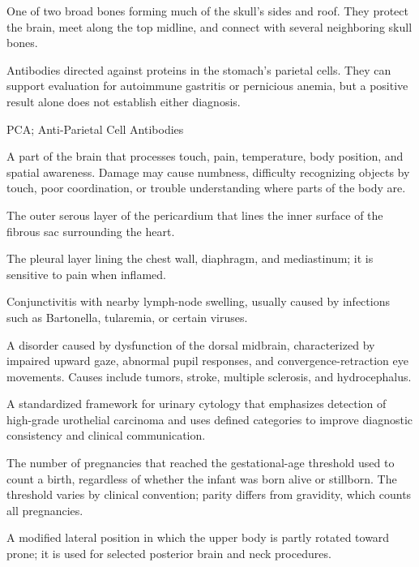  One of two broad bones forming much of the skull's sides and roof. They protect the brain, meet along the top midline, and connect with several neighboring skull bones.

 Antibodies directed against proteins in the stomach’s parietal cells. They can support evaluation for autoimmune gastritis or pernicious anemia, but a positive result alone does not establish either diagnosis.

\synonyms
PCA; Anti-Parietal Cell Antibodies

 A part of the brain that processes touch, pain, temperature, body position, and spatial awareness. Damage may cause numbness, difficulty recognizing objects by touch, poor coordination, or trouble understanding where parts of the body are.

 The outer serous layer of the pericardium that lines the inner surface of the fibrous sac surrounding the heart.

 The pleural layer lining the chest wall, diaphragm, and mediastinum; it is sensitive to pain when inflamed.

 Conjunctivitis with nearby lymph-node swelling, usually caused by infections such as Bartonella, tularemia, or certain viruses.

 A disorder caused by dysfunction of the dorsal midbrain, characterized by impaired upward gaze, abnormal pupil
responses, and convergence-retraction eye movements. Causes include tumors, stroke,
multiple sclerosis, and hydrocephalus.

 A standardized framework for urinary cytology that emphasizes detection of high-grade urothelial carcinoma and uses defined categories to improve diagnostic consistency and clinical communication.

 The number of pregnancies that reached the gestational-age threshold used to count a birth, regardless of whether the infant was born alive or stillborn. The threshold varies by clinical convention; parity differs from gravidity, which counts all pregnancies.

 A modified lateral position in which the upper body is partly rotated toward prone; it is used for selected posterior brain and neck procedures.

